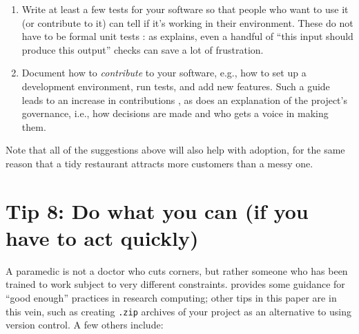 \documentclass[10pt,letterpaper]{article}
\begin{document}
\begin{enumerate}
\item
  Write at least a few tests for your software
  so that people who want to use it (or contribute to it)
  can tell if it's working in their environment.
  These do not have to be formal unit tests \cite{Irving2021}:
  as \cite{Taschuk2017} explains,
  even a handful of ``this input should produce this output'' checks
  can save a lot of frustration.

\item
  Document how to \emph{contribute} to your software,
  e.g.,
  how to set up a development environment,
  run tests,
  and add new features.
  Such a guide leads to an increase in contributions \cite{Sholler2019},
  as does an explanation of the project's governance,
  i.e.,
  how decisions are made and who gets a voice in making them.

\end{enumerate}

Note that all of the suggestions above will also help with adoption,
for the same reason that a tidy restaurant attracts more customers than a messy one.

\section*{Tip 8: Do what you can (if you have to act quickly)}

A paramedic is not a doctor who cuts corners,
but rather someone who has been trained to work subject to very different constraints.
\cite{Wilson2017} provides some guidance for ``good enough'' practices in research computing;
other tips in this paper are in this vein,
such as creating \texttt{.zip} archives of your project as an alternative to using version control.
A few others include:
\end{document}
